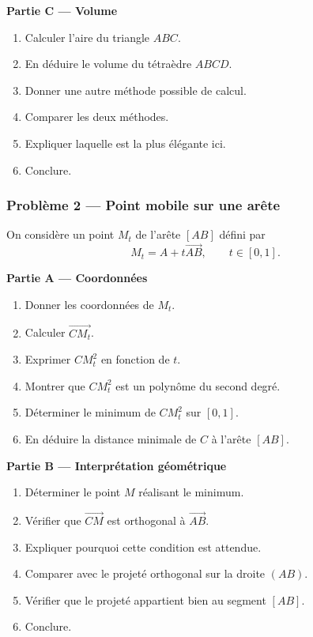 \documentclass[11pt,a4paper]{article}
\begin{document}
\begin{difficile}
\textbf{Partie C — Volume}
\begin{enumerate}
  \item Calculer l'aire du triangle $ABC$.
  \item En déduire le volume du tétraèdre $ABCD$.
  \item Donner une autre méthode possible de calcul.
  \item Comparer les deux méthodes.
  \item Expliquer laquelle est la plus élégante ici.
  \item Conclure.
\end{enumerate}

\subsubsection*{Problème 2 — Point mobile sur une arête}

On considère un point $M_t$ de l'arête $[AB]$ défini par
\[
M_t=A+t\overrightarrow{AB},\qquad t\in[0,1].
\]

\textbf{Partie A — Coordonnées}
\begin{enumerate}
  \item Donner les coordonnées de $M_t$.
  \item Calculer $\overrightarrow{CM_t}$.
  \item Exprimer $CM_t^2$ en fonction de $t$.
  \item Montrer que $CM_t^2$ est un polynôme du second degré.
  \item Déterminer le minimum de $CM_t^2$ sur $[0,1]$.
  \item En déduire la distance minimale de $C$ à l'arête $[AB]$.
\end{enumerate}

\textbf{Partie B — Interprétation géométrique}
\begin{enumerate}
  \item Déterminer le point $M$ réalisant le minimum.
  \item Vérifier que $\overrightarrow{CM}$ est orthogonal à $\overrightarrow{AB}$.
  \item Expliquer pourquoi cette condition est attendue.
  \item Comparer avec le projeté orthogonal sur la droite $(AB)$.
  \item Vérifier que le projeté appartient bien au segment $[AB]$.
  \item Conclure.
\end{enumerate}


\end{difficile}
\end{document}
